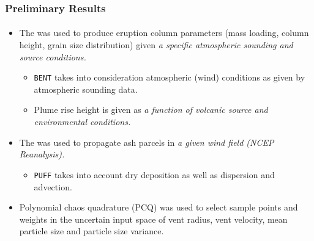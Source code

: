 \documentclass{beamer}
\begin{document}
\begin{frame}\frametitle{Preliminary Results}\framesubtitle{}
\begin{itemize}
\item<1-> The {} was used to produce eruption column parameters (mass loading, column height, grain size distribution) given \textit{a specific atmospheric sounding and source conditions. }
\begin{itemize}
\item<1->  \texttt{BENT} takes into consideration atmospheric (wind) conditions as given by atmospheric sounding data. 
\item<1-> Plume rise height is given as \alert{\textit{a function of volcanic source and environmental conditions. }}
\end{itemize}
\item<2-> The {} was used to propagate ash parcels in \textit{a given wind field (NCEP Reanalysis). }
\begin{itemize}
\item<2-> \texttt{PUFF} takes into account dry deposition as well as dispersion and advection.  
\end{itemize}
\item<3-> Polynomial chaos quadrature (PCQ) was used to select sample points and weights in the uncertain input space of \alert{vent radius, vent velocity, mean particle size and particle size variance. }
\end{itemize}
\end{frame}
\end{document}
